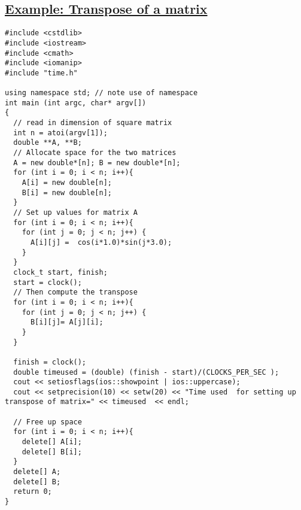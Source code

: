 \documentclass[%
oneside,                 %
final,                   %
10pt]{article}
\begin{document}
\subsection*{\href{{https://github.com/CompPhysics/ComputationalPhysicsMSU/blob/master/doc/Programs/LecturePrograms/programs/Classes/cpp/program8.cpp}}{Example: Transpose of a matrix}}


















































\begin{Verbatim}[numbers=none,fontsize=\fontsize{9pt}{9pt},baselinestretch=0.95]
#include <cstdlib>
#include <iostream>
#include <cmath>
#include <iomanip>
#include "time.h"

using namespace std; // note use of namespace
int main (int argc, char* argv[])
{
  // read in dimension of square matrix
  int n = atoi(argv[1]);
  double **A, **B;
  // Allocate space for the two matrices
  A = new double*[n]; B = new double*[n];
  for (int i = 0; i < n; i++){
    A[i] = new double[n];
    B[i] = new double[n];
  }
  // Set up values for matrix A
  for (int i = 0; i < n; i++){
    for (int j = 0; j < n; j++) {
      A[i][j] =  cos(i*1.0)*sin(j*3.0);
    }
  }
  clock_t start, finish;
  start = clock();
  // Then compute the transpose
  for (int i = 0; i < n; i++){
    for (int j = 0; j < n; j++) {
      B[i][j]= A[j][i];
    }
  }

  finish = clock();
  double timeused = (double) (finish - start)/(CLOCKS_PER_SEC );
  cout << setiosflags(ios::showpoint | ios::uppercase);
  cout << setprecision(10) << setw(20) << "Time used  for setting up transpose of matrix=" << timeused  << endl;

  // Free up space
  for (int i = 0; i < n; i++){
    delete[] A[i];
    delete[] B[i];
  }
  delete[] A;
  delete[] B;
  return 0;
}


\end{Verbatim}
\end{document}
